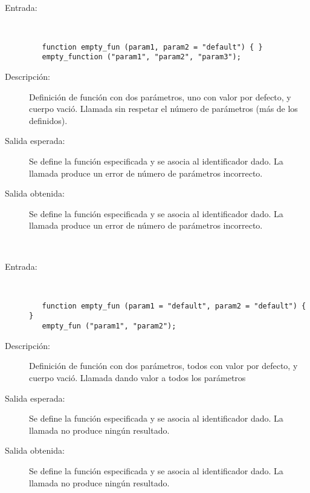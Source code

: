 \hfil \\
	\begin{description}
		\item [Entrada:] \hfill \\
\begin{lstlisting}
   function empty_fun (param1, param2 = "default") { } 
   empty_function ("param1", "param2", "param3");
\end{lstlisting}
		\item [Descripción:] Definición de función con dos parámetros, uno con valor por defecto, y cuerpo vació. Llamada sin respetar el número de parámetros (más de los definidos). 
		\item [Salida esperada:] Se define la función especificada y se asocia al identificador dado. La llamada produce un error de número de parámetros incorrecto.
		\item [Salida obtenida:] Se define la función especificada y se asocia al identificador dado. La llamada produce un error de número de parámetros incorrecto.
	\end{description}
\hfil \\
	\begin{description}
		\item [Entrada:] \hfill \\
\begin{lstlisting}
   function empty_fun (param1 = "default", param2 = "default") { } 
   empty_fun ("param1", "param2");
\end{lstlisting}
		\item [Descripción:] Definición de función con dos parámetros, todos con valor por defecto, y cuerpo vació. Llamada dando valor a todos los parámetros
		\item [Salida esperada:] Se define la función especificada y se asocia al identificador dado. La llamada no produce ningún resultado.
		\item [Salida obtenida:] Se define la función especificada y se asocia al identificador dado. La llamada no produce ningún resultado.
	\end{description}
\hfil \\
